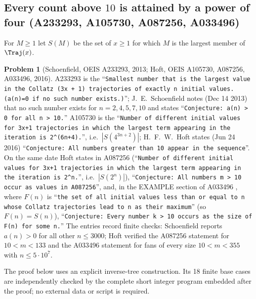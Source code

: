 \documentclass[11pt,a4paper]{article}
\theoremstyle{definition}
\newtheorem{problem}[theorem]{Problem}
\theoremstyle{remark}
\numberwithin{equation}{section}
\begin{document}
\subsection{Every count above $10$ is attained by a power of four (A233293, A105730, A087256, A033496)}

For $M\ge1$ let $S(M)$ be the set of $x\ge1$ for which $M$ is the largest member
of $\Traj(x)$.

\begin{problem}[Schoenfield, OEIS A233293, 2013; Hoft, OEIS A105730, A087256, A033496, 2016]\label{B:P:prob:A233293}
A233293 \cite{R049} is the ``\texttt{Smallest number that is the largest value
in the Collatz (3x + 1) trajectories of exactly n initial values. (a(n)=0 if no
such number exists.)}''; J.~E.~Schoenfield notes (Dec 14 2013) that no such
number exists for $n=2,4,5,7,10$ and states ``\texttt{Conjecture: a(n) > 0 for all
n > 10.}'' A105730 \cite{R050} is the ``\texttt{Number of different initial
values for 3x+1 trajectories in which the largest term appearing in the
iteration is 2\^{}(6n+4).}'', i.e.\ $|S(4^{3n+2})|$; H.~F.~W.~Hoft states
(Jun 24 2016) ``\texttt{Conjecture: All numbers greater than 10 appear in the
sequence}''. On the same date Hoft states in A087256 \cite{R051}
(``\texttt{Number of different initial values for 3x+1 trajectories in which the
largest term appearing in the iteration is 2\^{}n.}'', i.e.\ $|S(2^n)|$),
``\texttt{Conjecture: All numbers m > 10 occur as values in A087256}'', and, in the
EXAMPLE section of A033496 \cite{R052}, where $F(n)$ is ``\texttt{the set of all initial values
less than or equal to n whose Collatz trajectories lead to n as their
maximum}'' (so $F(n)=S(n)$), ``\texttt{Conjecture: Every number k > 10 occurs as
the size of F(n) for some n.}''
The entries record finite checks: Schoenfield reports $a(n)>0$ for all other $n\le3000$;
Hoft verified the A087256 statement for $10<m<133$ and the A033496 statement for fans
of every size $10<m<355$ with $n\le5\cdot10^7$.
\end{problem}

The proof below uses an explicit inverse-tree construction. Its 18 finite
base cases are independently checked by the complete short integer program
embedded after the proof; no external data or script is required.
\end{document}
